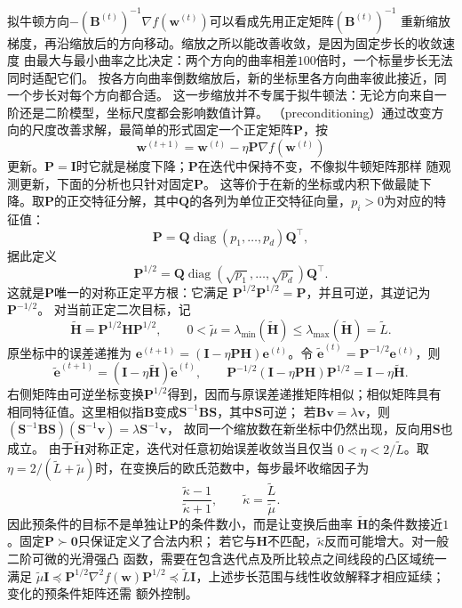拟牛顿方向$-(\bm B^{(t)})^{-1}\nabla f(\bm w^{(t)})$可以看成先用正定矩阵$(\bm B^{(t)})^{-1}$
重新缩放梯度，再沿缩放后的方向移动。缩放之所以能改善收敛，是因为固定步长的收敛速度
由最大与最小曲率之比决定：两个方向的曲率相差$100$倍时，一个标量步长无法同时适配它们。
按各方向曲率倒数缩放后，新的坐标里各方向曲率彼此接近，同一个步长对每个方向都合适。
这一步缩放并不专属于拟牛顿法：无论方向来自一阶还是二阶模型，坐标尺度都会影响数值计算。
（preconditioning）通过改变方向的尺度改善求解，最简单的形式固定一个正定矩阵$\bm{P}$，按
\[
  \bm{w}^{(t+1)}
  =
  \bm{w}^{(t)}-\eta\bm{P}\nabla f(\bm{w}^{(t)})
\]
更新。$\bm P=\bm I$时它就是梯度下降；$\bm P$在迭代中保持不变，不像拟牛顿矩阵那样
随观测更新，下面的分析也只针对固定$\bm P$。
这等价于在新的坐标或内积下做最陡下降。取$\bm P$的正交特征分解，其中$\bm Q$的各列为单位正交特征向量，$p_i>0$为对应的特征值：
\[
  \bm{P}
  =
  \bm{Q}\operatorname{diag}(p_1,\ldots,p_d)\bm{Q}^{\top},
\]
据此定义
\[
  \bm{P}^{1/2}
  =
  \bm{Q}\operatorname{diag}(\sqrt{p_1},\ldots,\sqrt{p_d})\bm{Q}^{\top}.
\]
这就是$\bm{P}$唯一的对称正定平方根：它满足
$\bm{P}^{1/2}\bm{P}^{1/2}=\bm{P}$，并且可逆，其逆记为$\bm{P}^{-1/2}$。
对当前正定二次目标，记
\[
  \widetilde{\bm{H}}=\bm{P}^{1/2}\bm{H}\bm{P}^{1/2},
  \qquad
  0<\widetilde{\mu}
  =\lambda_{\min}(\widetilde{\bm{H}})
  \leq\lambda_{\max}(\widetilde{\bm{H}})
  =\widetilde{L}.
\]
原坐标中的误差递推为
$\bm{e}^{(t+1)}=(\bm{I}-\eta\bm{P}\bm{H})\bm{e}^{(t)}$。令
$\widetilde{\bm{e}}^{(t)}=\bm{P}^{-1/2}\bm{e}^{(t)}$，则
\[
  \widetilde{\bm{e}}^{(t+1)}
  =
  (\bm{I}-\eta\widetilde{\bm{H}})
  \widetilde{\bm{e}}^{(t)},
  \qquad
  \bm{P}^{-1/2}
  (\bm{I}-\eta\bm{P}\bm{H})
  \bm{P}^{1/2}
  =
  \bm{I}-\eta\widetilde{\bm{H}}.
\]
右侧矩阵由可逆坐标变换$\bm{P}^{1/2}$得到，因而与原误差递推矩阵相似；相似矩阵具有
相同特征值。这里相似指$\bm B$变成$\bm S^{-1}\bm B\bm S$，其中$\bm S$可逆；
若$\bm B\bm v=\lambda\bm v$，则
$(\bm S^{-1}\bm B\bm S)(\bm S^{-1}\bm v)=\lambda\bm S^{-1}\bm v$，
故同一个缩放数在新坐标中仍然出现，反向用$\bm S$也成立。
由于$\widetilde{\bm{H}}$对称正定，迭代对任意初始误差收敛当且仅当
$0<\eta<2/\widetilde{L}$。取
$\eta=2/(\widetilde{L}+\widetilde{\mu})$时，在变换后的欧氏范数中，每步最坏收缩因子为
\[
  \frac{\widetilde{\kappa}-1}{\widetilde{\kappa}+1},
  \qquad
  \widetilde{\kappa}
  =\frac{\widetilde{L}}{\widetilde{\mu}}.
\]
因此预条件的目标不是单独让$\bm{P}$的条件数小，而是让变换后曲率
$\widetilde{\bm{H}}$的条件数接近$1$。固定$\bm{P}\succ\bm{0}$只保证定义了合法内积；
若它与$\bm{H}$不匹配，$\widetilde{\kappa}$反而可能增大。对一般二阶可微的光滑强凸
函数，需要在包含迭代点及所比较点之间线段的凸区域统一满足
$\widetilde{\mu}\bm{I}\preceq
\bm{P}^{1/2}\nabla^2f(\bm{w})\bm{P}^{1/2}
\preceq\widetilde{L}\bm{I}$，上述步长范围与线性收敛解释才相应延续；变化的预条件矩阵还需
额外控制。

